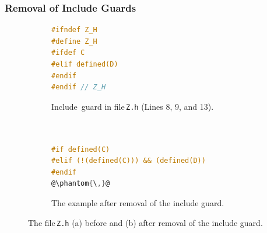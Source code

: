 \documentclass{beamer}
\newcommand\code[1]{\texttt{#1}}
\begin{document}
\begin{frame}[fragile]
\frametitle{Removal of Include Guards}


\begin{figure}[ht]
  \centering
  \begin{subfigure}[b]{0.4\textwidth}
	\begin{lstlisting}[language=C, firstnumber=8]
#ifndef Z_H
#define Z_H
#ifdef C
#elif defined(D)
#endif
#endif // Z_H
		\end{lstlisting}
		\caption{Include~guard in file\,\code{Z.h} (Lines 8, 9, and 13).}
		\label{fig:includeguard:a}
  \end{subfigure}
  \hfill
  \begin{subfigure}[b]{0.52\textwidth}
					\begin{lstlisting}[language=C, firstnumber=8]


#if defined(C)
#elif (!(defined(C))) && (defined(D))
#endif
@\phantom{\,}@
					\end{lstlisting}
		\caption{The example after removal of the include guard.}
		\label{fig:includeguard:b}
  \end{subfigure}
  
  \caption{The file\,\code{Z.h} (a) before and (b) after removal of the include guard.}
  
\end{figure}


\end{frame}
\end{document}
